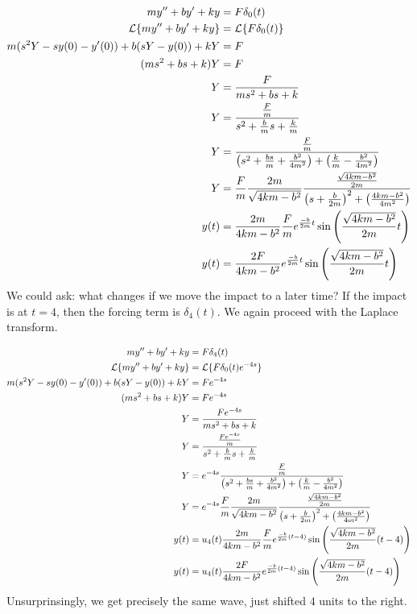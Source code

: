 \documentclass[fleqn,letterpaper]{report}
\begin{document}
\begin{example}
\begin{align*}
my^{\prime \prime} + by^\prime + ky & = F \delta_0(t) \\
\mathcal{L} \{ my^{\prime \prime} + by^\prime + ky \} & = \mathcal{L} \{ F
\delta_0(t) \} \\ 
m (s^2 Y - s y(0) - y^\prime(0)) + b(sY - y(0)) + kY & = F \\
(ms^2 + bs + k) Y & = F \\
Y & = \frac{F}{ms^2 + bs + k} \\
Y & = \frac{\frac{F}{m}}{s^2 + \frac{b}{m}s + \frac{k}{m}} \\
Y & = \frac{\frac{F}{m}}{\left( s^2 + \frac{bs}{m} +
\frac{b^2}{4m^2} \right) + \left( \frac{k}{m} - \frac{b^2}{4m^2}
\right) } \\
Y & = \frac{F}{m} \frac{2m}{\sqrt{4km-b^2}}
\frac{\frac{\sqrt{4km-b^2}}{2m}}{\left( s + \frac{b}{2m} \right)^2 +
\left( \frac{4km - b^2}{4m^2} \right) } \\
y(t) & = \frac{2m}{4km-b^2} \frac{F}{m} e^{\frac{-b}{2m}t} \sin \left(
\frac{\sqrt{4km-b^2}}{2m}t \right) \\
y(t) & = \frac{2F}{4km-b^2} e^{\frac{-b}{2m}t} \sin \left(
\frac{\sqrt{4km-b^2}}{2m}t \right) \\
\end{align*} 
We could ask: what changes if we move the impact to a later
time? If the impact is at $t=4$, then the forcing term is 
$\delta_4(t)$. We again proceed with the Laplace transform.

\begin{align*}
my^{\prime \prime} + by^\prime + ky & = F \delta_4(t) \\
\mathcal{L} \{ my^{\prime \prime} + by^\prime + ky \} & = \mathcal{L} \{ F
\delta_0(t) e^{-4s}\} \\ 
m (s^2 Y - s y(0) - y^\prime(0)) + b(sY - y(0)) + kY & = F
e^{-4s} \\
(ms^2 + bs + k) Y & = F e^{-4s} \\
Y & = \frac{Fe^{-4s}}{ms^2 + bs + k} \\
Y & = \frac{\frac{Fe^{-4s}}{m}}{s^2 + \frac{b}{m}s + \frac{k}{m}} \\
Y & = e^{-4s} \frac{\frac{F}{m}}{\left( s^2 + \frac{bs}{m} +
\frac{b^2}{4m^2} \right) + \left( \frac{k}{m} - \frac{b^2}{4m^2}
\right) } \\
Y & = e^{-4s} \frac{F}{m} \frac{2m}{\sqrt{4km-b^2}}
\frac{\frac{\sqrt{4km-b^2}}{2m}}{\left( s + \frac{b}{2m} \right)^2 +
\left( \frac{4km - b^2}{4m^2} \right) } \\
y(t) & = u_4(t) \frac{2m}{4km-b^2} \frac{F}{m}
e^{\frac{-b}{2m}(t-4)} \sin \left(
\frac{\sqrt{4km-b^2}}{2m} (t-4) \right) \\
y(t) & = u_4(t) \frac{2F}{4km-b^2} e^{\frac{-b}{2m} (t-4) } \sin
\left( \frac{\sqrt{4km-b^2}}{2m} (t-4) \right) \\
\end{align*} 
Unsurprinsingly, we get precisely the same wave, just shifted $4$
units to the right. 
\end{example}
\end{document}
